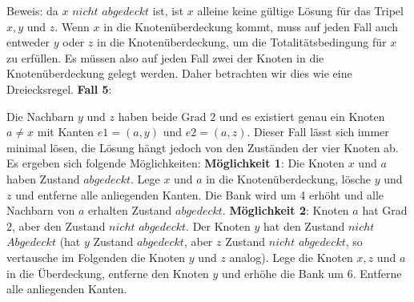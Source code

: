 \documentclass[12pt,onecolumn, notitlepage]{scrartcl}
\begin{document}
Beweis: da $x$ $nicht$ $abgedeckt$ ist, ist $x$ alleine keine gültige Lösung für das Tripel $x,y$ und $z$. Wenn $x$ in die Knotenüberdeckung kommt, muss auf jeden Fall auch entweder $y$ oder $z$ in die Knotenüberdeckung, um die Totalitätsbedingung für $x$ zu erfüllen. Es müssen also auf jeden Fall zwei der Knoten in die Knotenüberdeckung gelegt werden. Daher betrachten wir dies wie eine Dreiecksregel.\newline\newline
\textbf{Fall 5}:\newline
\begin{center}
\end{center}
Die Nachbarn $y$ und $z$ haben beide Grad $2$ und es existiert genau ein Knoten $a \neq x$ mit Kanten $e1 = (a,y)$ und $e2 = (a,z)$. Dieser Fall lässt sich immer minimal lösen, die Lösung hängt jedoch von den Zuständen der vier Knoten ab. Es ergeben sich folgende Möglichkeiten:\newline \newline
\textbf{Möglichkeit 1}:\newline
Die Knoten $x$ und $a$ haben Zustand $abgedeckt$.  Lege $x$ und $a$ in die Knotenüberdeckung, lösche $y$ und $z$ und entferne alle anliegenden Kanten. Die Bank wird um 4 erhöht und alle Nachbarn von $a$ erhalten Zustand $abgedeckt$. \newline\newline
\textbf{Möglichkeit 2}:\newline
Knoten $a$ hat Grad $2$, aber den Zustand $nicht$ $abgedeckt$. Der Knoten $y$ hat den Zustand $nicht$ $Abgedeckt$ (hat $y$ Zustand $abgedeckt$, aber $z$ Zustand $nicht $ $abgedeckt$, so vertausche im Folgenden die Knoten $y$ und $z$ analog). Lege die Knoten $x,z$ und $a$ in die Überdeckung, entferne den Knoten $y$ und erhöhe die Bank um 6. Entferne alle anliegenden Kanten.\newline\newline
\end{document}

